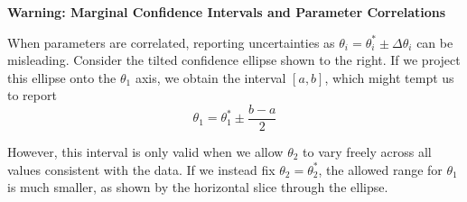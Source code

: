 \begin{warningBox}
    \textbf{Warning: Marginal Confidence Intervals and Parameter Correlations}
    
    \vspace{0.3cm}
    \begin{minipage}{0.55\textwidth}
        When parameters are correlated, reporting uncertainties as $\theta_i = \theta_i^* \pm \Delta\theta_i$ can be misleading. Consider the tilted confidence ellipse shown to the right. If we project this ellipse onto the $\theta_1$ axis, we obtain the interval $[a, b]$, which might tempt us to report
        \begin{equation*}
            \theta_1 = \theta_1^* \pm \frac{b-a}{2}
        \end{equation*}
        
        However, this interval is only valid when we allow $\theta_2$ to vary freely across all values consistent with the data. If we instead fix $\theta_2 = \theta_2^*$, the allowed range for $\theta_1$ is much smaller, as shown by the horizontal slice through the ellipse.
    \end{minipage}%
    \hfill
    \begin{minipage}{0.42\textwidth}
        \centering
\end{minipage}
\end{warningBox}
